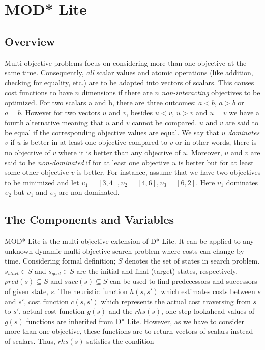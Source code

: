 \documentclass[10pt, a4paper, conference, compsocconf]{IEEEtran}
\begin{document}
\section{MOD* Lite}
\subsection{Overview}
Multi-objective problems focus on considering more than one objective at the same time. Consequently, \textit{all} scalar values and atomic operations (like addition, checking for equality, etc.) are to be adapted into vectors of scalars. This causes cost functions to have $n$ dimensions if there are $n$ \textit{non-interacting} objectives to be optimized. For two scalars a and b, there are three outcomes: $a<b$, $a>b$ or $a=b$. However for two vectors $u$ and $v$, besides $u<v$, $u>v$ and $u=v$ we have a fourth alternative meaning that $u$ and $v$ cannot be compared. $u$ and $v$ are said to be equal if the corresponding objective values are equal. We say that $u$ \textit{dominates} $v$ if $u$ is better in at least one objective compared to $v$ or in other words, there is no objective of $v$ where it is better than any objective of $u$. Moreover, $u$ and $v$ are said to be {\it non-dominated} if for at least one objective $u$ is better but for at least some other objective $v$ is better. For instance, assume that we have two objectives to be minimized and let $\upsilon_{1}=[3,4], \upsilon_{2}=[4,6], \upsilon_{3}=[6,2] $. Here $\upsilon_{1}$ dominates $\upsilon_{2}$ but $\upsilon_{1}$ and $\upsilon_{3}$ are non-dominated.

\subsection{The Components and Variables}
MOD* Lite is the multi-objective extension of D* Lite. It can be applied to any unknown dynamic multi-objective search problem where costs can change by time. Considering formal definition; $S$ denotes the set of states in search problem. $s_{start} \in S$ and $s_{goal} \in S$ are the initial and final (target) states, respectively. $pred(s) \subseteq S$ and $succ(s) \subseteq S$ can be used to find predecessors and successors of given state, $s$. The heuristic function $h(s, s')$ which estimates costs between $s$ and $s'$, cost function $c(s, s')$ which represents the actual cost traversing from $s$ to $s'$, actual cost function $g(s)$ and the $rhs(s)$, one-step-lookahead values of $g(s)$ functions are inherited from D* Lite. However, as we have to consider more than one objective, these functions are to return vectors of scalars instead of scalars. Thus, $rhs(s)$ satisfies the condition
\end{document}
